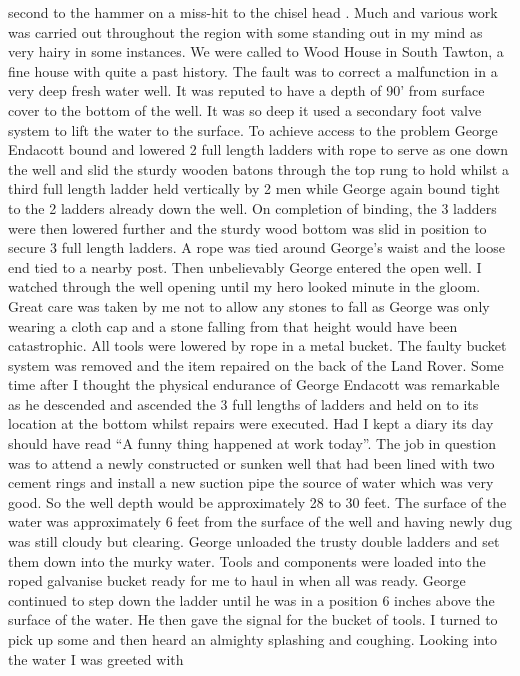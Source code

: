 second to the hammer on a miss-hit to the chisel head . Much and various work
was carried out throughout the region with some standing out in my mind as very
hairy in some instances. We were called to Wood House in South Tawton, a fine
house with quite a past history. The fault was to correct a malfunction in a
very deep fresh water well. It was reputed to have a depth of 90' from surface
cover to the bottom of the well. It was so deep it used a secondary foot valve
system to lift the water to the surface. To achieve access to the problem
George Endacott bound and lowered 2 full length ladders with rope to serve as
one down the well and slid the sturdy wooden batons through the top rung to
hold whilst a third full length ladder held vertically by 2 men while George
again bound tight to the 2 ladders already down the well. On completion of
binding, the 3 ladders were then lowered further and the sturdy wood bottom was
slid in position to secure 3 full length ladders. A rope was tied around
George's waist and the loose end tied to a nearby post. Then unbelievably
George entered the open well. I watched through the well opening until my hero
looked minute in the gloom. Great care was taken by me not to allow any stones
to fall as George was only wearing a cloth cap and a stone falling from that
height would have been catastrophic. All tools were lowered by rope in a metal
bucket. The faulty bucket system was removed and the item repaired on the back
of the Land Rover. Some time after I thought the physical endurance of George
Endacott was remarkable as he descended and ascended the 3 full lengths of
ladders and held on to its location at the bottom whilst repairs were executed.
Had I kept a diary its day should have read ``A funny thing happened at work
today''. The job in question was to attend a newly constructed or sunken well
that had been lined with two cement rings and install a new suction pipe the
source of water which was very good. So the well depth would be approximately
28 to 30 feet. The surface of the water was approximately 6 feet from the
surface of the well and having newly dug was still cloudy but clearing. George
unloaded the trusty double ladders and set them down into the murky water.
Tools and components were loaded into the roped galvanise bucket ready for me
to haul in when all was ready. George continued to step down the ladder until
he was in a position 6 inches above the surface of the water. He then gave the
signal for the bucket of tools. I turned to pick up some and then heard an
almighty splashing and coughing. Looking into the water I was greeted with
